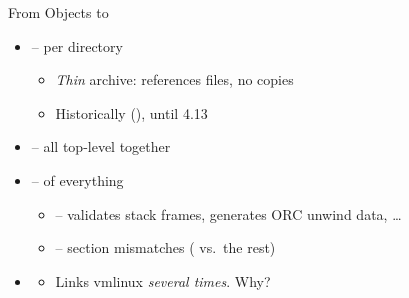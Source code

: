 \begin{frame}{From Objects to }

  \begin{itemize}[<+->]
    \item {} -- per directory
      \begin{itemize}[<+->]
	\item \emph{Thin} archive: references  files, no copies
	\item Historically  (), until 4.13
      \end{itemize}
    \item {} -- all top-level  together
    \item {} --  of everything
      \begin{itemize}[<+->]
	\item {} -- validates stack frames, generates ORC unwind
	  data, \dots
	\item {} -- section mismatches ( vs.\ the rest)
      \end{itemize}
    \item {}
      \begin{itemize}[<.->]
	\item Links vmlinux \emph{several times}. Why?
      \end{itemize}
  \end{itemize}

\end{frame}

